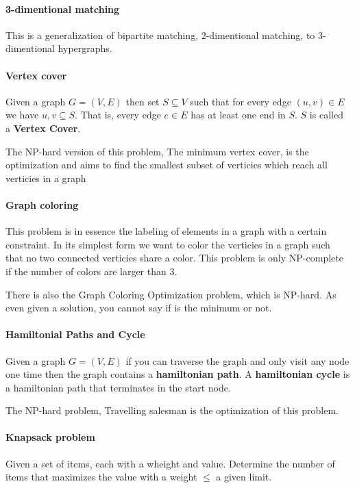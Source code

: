 \documentclass[12pt]{article} %
\begin{document}
\paragraph{3-dimentional matching}
This is a generalization of bipartite matching, 2-dimentional matching, to 3-dimentional hypergraphs.

\paragraph{Vertex cover}
Given a graph $G = (V, E)$ then set $S \subseteq V$ such that for every edge $(u, v) \in E$ we have ${u, v} \subseteq S$. That is, every edge $e \in E$ has at least one end in $S$. $S$ is called a \textbf{Vertex Cover}.

\par The NP-hard version of this problem, The minimum vertex cover, is the optimization and aims to find the smallest subset of verticies which reach all verticies in a graph 

\paragraph{Graph coloring}
This problem is in essence the labeling of elements in a graph with a certain constraint. In its simplest form we want to color the verticies in a graph such that no two connected verticies share a color. This problem is only NP-complete if the number of colors are larger than 3.

\par There is also the Graph Coloring Optimization problem, which is NP-hard. As even given a solution, you cannot say if is the minimum or not.

\paragraph{Hamiltonial Paths and Cycle}
Given a graph $G = (V, E)$ if you can traverse the graph and only visit any node one time then the graph contains a \textbf{hamiltonian path}. A \textbf{hamiltonian cycle} is a hamiltonian path that terminates in the start node.

\par The NP-hard problem, Travelling salesman is the optimization of this problem.

\paragraph{Knapsack problem}
Given a set of items, each with a wheight and value. Determine the number of items that maximizes the value with a weight $\leq$ a given limit.  
\end{document}
